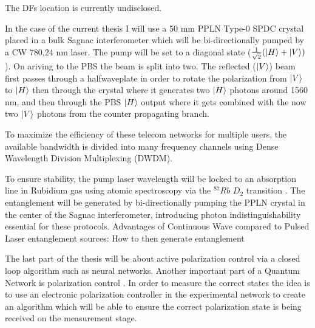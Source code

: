 \documentclass{article}
\theoremstyle{mytheoremstyle}
\theoremstyle{mytheoremstyle}
\theoremstyle{myproblemstyle}
\begin{document}
The DFs location is currently undisclosed.

In the case of the current thesis I will use a 50 mm PPLN Type-0 SPDC crystal placed in a bulk Sagnac interferometer which will be bi-directionally
pumped by a CW 780,24 nm laser. The pump will be set to a diagonal state ($\frac{1}{\sqrt{2}}(\ket{H} + \ket{V})$). On ariving to the
PBS the beam is split into two. The reflected ($\ket{V}$) beam first passes through a halfwaveplate in order to rotate the polarization from $\ket{V}$ to $\ket{H}$
then through the crystal where it generates two $\ket{H}$ photons around 1560 nm, and then through the PBS $\ket{H}$ output where it gets combined
with the now two $\ket{V}$ photons from the counter propagating branch.

To maximize the efficiency of these telecom networks for multiple users,
the available bandwidth is divided into many frequency channels using Dense Wavelength Division Multiplexing (DWDM).

To ensure stability, the pump laser wavelength will be locked to an absorption line in Rubidium gas using atomic spectroscopy via the $^{87}Rb$ $D_2$ transition \cite{metger2017sas}.
The entanglement will be generated by bi-directionally pumping the PPLN crystal in the center of the Sagnac interferometer,
introducing photon indistinguishability essential for these protocols.
Advantages of Continuous Wave compared to Pulsed Laser entanglement sources:
How to then generate entanglement

The last part of the thesis will be about active polarization control via a closed loop algorithm such as neural networks.
Another important part of a Quantum Network is polarization control \cite{CCSHDCDRS}. In order to measure the correct states the
idea is to use an electronic polarization controller in the experimental network to create an algorithm which will be able to
ensure the correct polarization state is being received on the measurement stage.
\end{document}
